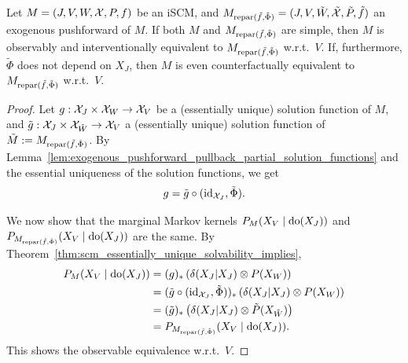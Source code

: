 \begin{Thm}\label{thm:various_equiv_exogenous_pushforward}
  Let $M = \left ( J, V, W, \mathcal{X}, P, f \right )$ be an iSCM, and $M_{\mathrm{repar}({\tilde{f}},{\tilde{\Phi}})} = ( J, V, \tilde{W}, \tilde{\mathcal{X}}, \tilde{P}, \tilde{f} )$ an exogenous pushforward of $M$.
  If both $M$ and $M_{\mathrm{repar}({\tilde{f}},{\tilde{\Phi}})}$ are simple,
  then $M$ is observably and interventionally equivalent to $M_{\mathrm{repar}({\tilde{f}},{\tilde{\Phi}})}$ w.r.t.\ $V$.
  If, furthermore, $\tilde{\Phi}$ does not depend on $X_J$, then $M$ is even counterfactually equivalent to $M_{\mathrm{repar}({\tilde{f}},{\tilde{\Phi}})}$ w.r.t.\ $V$.
\end{Thm}
\begin{proof}
  Let $g : \mathcal{X}_J \times \mathcal{X}_W \to \mathcal{X}_V$ be a (essentially unique) solution function of $M$, 
  and $\tilde{g} : \mathcal{X}_J \times \mathcal{X}_{\tilde{W}} \to \mathcal{X}_V$ a (essentially unique) solution function of $\tilde{M} := M_{\mathrm{repar}({\tilde{f}},{\tilde{\Phi}})}$.
  By Lemma~\ref{lem:exogenous_pushforward_pullback_partial_solution_functions} and the essential uniqueness of the solution functions, we get
  $$g = \tilde g \circ (\mathrm{id}_{\mathcal{X}_J},\tilde{\Phi}).$$

  We now show that the marginal Markov kernels $P_{M}(X_V \mid \operatorname{do}(X_J))$ and $P_{M_{\mathrm{repar}({\tilde{f}},{\tilde{\Phi}})}}(X_V \mid \operatorname{do}(X_J))$ are the same.
  By Theorem~\ref{thm:scm_essentially_unique_solvability_implies}, 
  \begin{align*}
    P_{M}(X_V \mid \operatorname{do}(X_J)) 
    & = (g)_* \left ( \delta(X_J|X_J) \otimes P(X_W) \right ) \\
    & = (\tilde g \circ (\mathrm{id}_{\mathcal{X}_J},\tilde{\Phi}))_* \left ( \delta(X_J|X_J) \otimes P(X_W) \right ) \\
    & = (\tilde{g})_* \left ( \delta(X_J|X_J) \otimes \tilde{P}(X_{\tilde{W}})  \right ) \\
    & = P_{M_{\mathrm{repar}({\tilde{f}},{\tilde{\Phi}})}}(X_V \mid \operatorname{do}(X_J)).
  \end{align*}
  This shows the observable equivalence w.r.t.\ $V$.


\end{proof}
